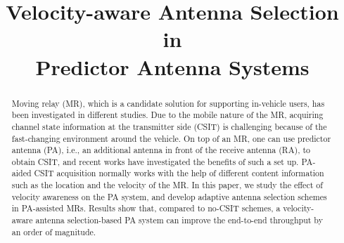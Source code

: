 \documentclass[conference]{IEEEtran}
\begin{document}
\captionsetup{belowskip=0pt,aboveskip=0pt}

\title{Velocity-aware Antenna Selection in \\Predictor Antenna Systems}
\author{
\and
{}
\and
{}
}







\maketitle


\begin{abstract}
Moving relay (MR), which is a candidate solution for supporting in-vehicle users, has been investigated in different studies. Due to the mobile nature of the MR, acquiring channel state information at the transmitter side (CSIT) is challenging because of the fast-changing environment around the vehicle. On  top of an MR, one can use predictor antenna (PA), i.e., an additional antenna in front of the receive antenna (RA), to obtain CSIT, and recent works have investigated the benefits of such a set up. PA-aided CSIT acquisition normally works with the help of different content information such as the location and the velocity of the MR. In this paper, we study the effect of velocity awareness on the PA system, and develop adaptive antenna selection schemes in PA-assisted MRs. Results show that, compared to no-CSIT schemes, a velocity-aware antenna selection-based PA system can improve the end-to-end throughput by an order of magnitude.
\end{abstract}
\end{document}
